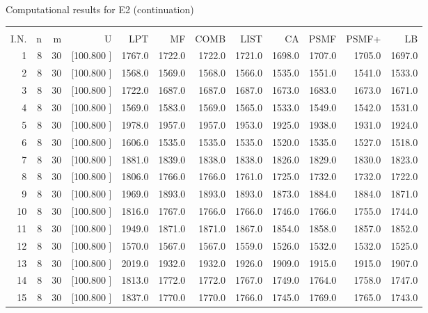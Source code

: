 \documentclass[12pt,a4paper]{article}
\begin{document}
\begin{center}
 Computational results for E2 (continuation) {\tiny
\begin{tabular}{r r r r r r r r r r r r}\hline
    &   &   &          &        &        &        &        &        &        &        &       \\[-0.1in]
  I.N.  &  n  &  m  &  U  &  LPT  &  MF  &  COMB  &  LIST  &  CA  & PSMF &PSMF+ & LB \\[0.03in]
\hline
   1&  8& 30&[100.800   ]&  1767.0&  1722.0&  1722.0&  1721.0&  1698.0&  1707.0&  1705.0&  1697.0\\[-0.02in]
   2&  8& 30&[100.800   ]&  1568.0&  1569.0&  1568.0&  1566.0&  1535.0&  1551.0&  1541.0&  1533.0\\[-0.02in]
   3&  8& 30&[100.800   ]&  1722.0&  1687.0&  1687.0&  1687.0&  1673.0&  1683.0&  1673.0&  1671.0\\[-0.02in]
   4&  8& 30&[100.800   ]&  1569.0&  1583.0&  1569.0&  1565.0&  1533.0&  1549.0&  1542.0&  1531.0\\[-0.02in]
   5&  8& 30&[100.800   ]&  1978.0&  1957.0&  1957.0&  1953.0&  1925.0&  1938.0&  1931.0&  1924.0\\[-0.02in]
   6&  8& 30&[100.800   ]&  1606.0&  1535.0&  1535.0&  1535.0&  1520.0&  1535.0&  1527.0&  1518.0\\[-0.02in]
   7&  8& 30&[100.800   ]&  1881.0&  1839.0&  1838.0&  1838.0&  1826.0&  1829.0&  1830.0&  1823.0\\[-0.02in]
   8&  8& 30&[100.800   ]&  1806.0&  1766.0&  1766.0&  1761.0&  1725.0&  1732.0&  1732.0&  1722.0\\[-0.02in]
   9&  8& 30&[100.800   ]&  1969.0&  1893.0&  1893.0&  1893.0&  1873.0&  1884.0&  1884.0&  1871.0\\[-0.02in]
  10&  8& 30&[100.800   ]&  1816.0&  1767.0&  1766.0&  1766.0&  1746.0&  1766.0&  1755.0&  1744.0\\[-0.02in]
  11&  8& 30&[100.800   ]&  1949.0&  1871.0&  1871.0&  1867.0&  1854.0&  1858.0&  1857.0&  1852.0\\[-0.02in]
  12&  8& 30&[100.800   ]&  1570.0&  1567.0&  1567.0&  1559.0&  1526.0&  1532.0&  1532.0&  1525.0\\[-0.02in]
  13&  8& 30&[100.800   ]&  2019.0&  1932.0&  1932.0&  1926.0&  1909.0&  1915.0&  1915.0&  1907.0\\[-0.02in]
  14&  8& 30&[100.800   ]&  1813.0&  1772.0&  1772.0&  1767.0&  1749.0&  1764.0&  1758.0&  1747.0\\[-0.02in]
  15&  8& 30&[100.800   ]&  1837.0&  1770.0&  1770.0&  1766.0&  1745.0&  1769.0&  1765.0&  1743.0\\[-0.02in]

\end{tabular}}
\end{center}
\end{document}
